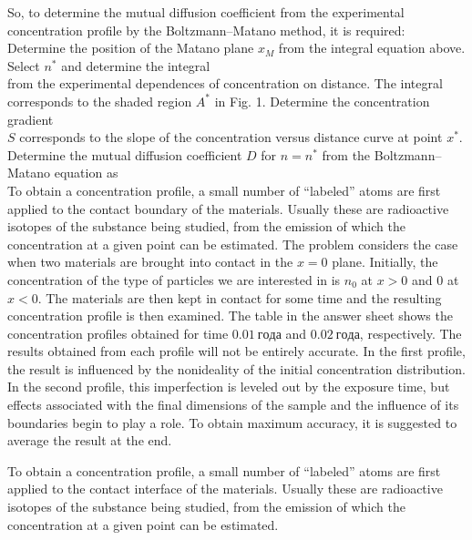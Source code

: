 \documentclass[11pt,a4paper]{article}
\begin{document}
So, to determine the mutual diffusion coefficient from the experimental concentration profile by the Boltzmann–Matano method, it is required: Determine the position of the Matano plane $x_M$ from the integral equation above. Select $n^*$ and determine the integral \\[A^*=\int\limits_\{n_L\}^\{n^*\} (x_M-x)~ \mathrm d n\quad\text\{либо\}\quad A^*=\int\limits_\{n^*\}^\{n_R\} (x-x_M)~ \mathrm d n\\] from the experimental dependences of concentration on distance. The integral corresponds to the shaded region $A^*$ in Fig. 1. Determine the concentration gradient \\[S=\left.\cfrac\{\mathrm d n\}\{ \mathrm d x\}\right|_\{n^*\}.\\]$S$ corresponds to the slope of the concentration versus distance curve at point $x^*$. Determine the mutual diffusion coefficient $D$ for $n=n^*$ from the Boltzmann–Matano equation as \\[D\left(n^*/n_0\right)=\cfrac\{A^*\}\{2 t S\}.\\] To obtain a concentration profile, a small number of “labeled” atoms are first applied to the contact boundary of the materials. Usually these are radioactive isotopes of the substance being studied, from the emission of which the concentration at a given point can be estimated. The problem considers the case when two materials are brought into contact in the $x=0$ plane. Initially, the concentration of the type of particles we are interested in is $n_0$ at $x>0$ and $0$ at $x<0$. The materials are then kept in contact for some time and the resulting concentration profile is then examined. The table in the answer sheet shows the concentration profiles obtained for time $0.01~года$ and $0.02~года$, respectively. The results obtained from each profile will not be entirely accurate. In the first profile, the result is influenced by the nonideality of the initial concentration distribution. In the second profile, this imperfection is leveled out by the exposure time, but effects associated with the final dimensions of the sample and the influence of its boundaries begin to play a role. To obtain maximum accuracy, it is suggested to average the result at the end.

To obtain a concentration profile, a small number of “labeled” atoms are first applied to the contact interface of the materials. Usually these are radioactive isotopes of the substance being studied, from the emission of which the concentration at a given point can be estimated.
\end{document}
